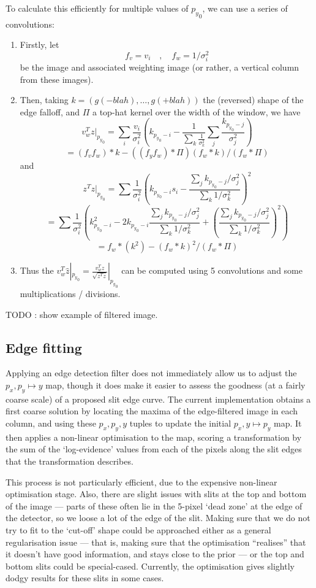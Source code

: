 To calculate this efficiently for multiple values of ${p_y}_0$, we can
use a series of convolutions:
\begin{enumerate}
\item Firstly, let
\[
f_v = v_i \quad , \quad f_w = 1/\sigma_i^2
\]
be the image and associated weighting image (or rather, a vertical
column from these images).
%
\item Then, taking $k = (g(-blah), \dots, g(+blah))$ the (reversed)
shape of the edge falloff, and $\Pi$ a top-hat kernel over the width of
the window, we have
\[
v_w^T z |_{{p_y}_0} 
= \sum_i \frac{v_i}{\sigma_i^2} \left(k_{{p_y}_0-i} - \frac{1}{\sum_k \frac{1}{\sigma_k^2}}
\sum_j \frac{k_{{p_y}_0-j}}{\sigma_j^2}\right)
\]
\[
= (f_v f_w) * k - ((f_y f_w) * \Pi)(f_w * k) / (f_w * \Pi)
\]
and
\[
z^T z |_{{p_y}_0}
= 
\sum \frac{1}{\sigma_i^2}\left(k_{{p_y}_0-i}s_i - \frac{\sum_j k_{{p_y}_0-j}/\sigma_j^2}
{\sum_k 1/\sigma_k^2}\right)^2
\]
\[
=
\sum \frac{1}{\sigma_i^2}\left(k_{{p_y}_0-i}^2 - 2 k_{{p_y}_0-i} \frac{\sum_j k_{{p_y}_0-j}/\sigma_j^2}
{\sum_k 1/\sigma_k^2} + \left(\frac{\sum_j k_{{p_y}_0-j}/\sigma_j^2}
{\sum_k 1/\sigma_k^2}\right)^2\right)
\]
\[
 = f_w * (k^2) - (f_w * k)^2 / (f_w * \Pi)
\]
%
\item Thus the $v_w^T \hat z |_{{p_y}_0} = \frac{v_w^T z}{\sqrt{z^T z}}|_{{p_y}_0}$
can be computed using 5 convolutions and some multiplications / divisions.
\end{enumerate}

TODO : show example of filtered image.

\subsection{Edge fitting}

Applying an edge detection filter does not immediately allow us to
adjust the $p_x, p_y \mapsto y$ map, though it does make it easier to
assess the goodness (at a fairly coarse scale) of a proposed slit edge
curve. The current implementation obtains a first coarse solution by
locating the maxima of the edge-filtered image in each column, and using
these $p_x, p_y, y$ tuples to update the initial $p_x, y \mapsto p_y$
map. It then applies a non-linear optimisation to the map, scoring a
transformation by the sum of the `log-evidence' values from each of the
pixels along the slit edges that the transformation describes.

This process is not particularly efficient, due to the expensive
non-linear optimisation stage. Also, there are slight issues with slits
at the top and bottom of the image --- parts of these often lie in the
5-pixel `dead zone' at the edge of the detector, so we loose a lot of
the edge of the slit. Making sure that we do not try to fit to the
`cut-off' shape could be approached either as a general regularisation
issue --- that is, making sure that the optimisation ``realises'' that
it doesn't have good information, and stays close to the prior ---
or the top and bottom slits could be special-cased. Currently, the
optimisation gives slightly dodgy results for these slits in some cases.

